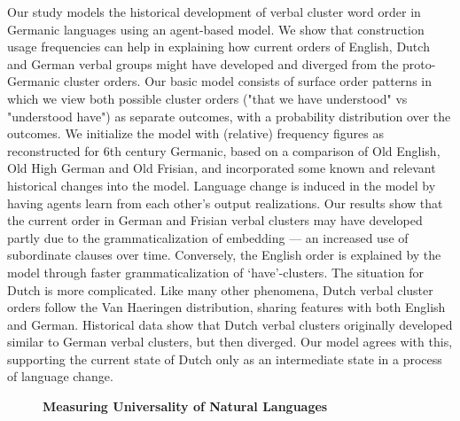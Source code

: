\documentclass[10pt, a4paper, twopage, headinclude, footinclude, BCOR5mm]{scrartcl}
\begin{document}
\noindent
Our study models the historical development of verbal cluster word order in Germanic languages using an agent-based model. We show that construction usage frequencies can help in explaining how current orders of English, Dutch and German verbal groups might have developed and diverged from the proto-Germanic cluster orders. Our basic model consists of surface order patterns in which we view both possible cluster orders ("that we have understood" vs "understood have") as separate outcomes, with a probability distribution over the outcomes. We initialize the model with (relative) frequency figures as reconstructed for 6th century Germanic, based on a comparison of Old English, Old High German and Old Frisian, and incorporated some known and relevant historical changes into the model. Language change is induced in the model by having agents learn from each other's output realizations.  Our results show that the current order in German and Frisian verbal clusters may have developed partly due to the grammaticalization of embedding --- an increased use of subordinate clauses over time. Conversely, the English order is explained by the model through faster grammaticalization of `have'-clusters. The situation for Dutch is more complicated. Like many other phenomena, Dutch verbal cluster orders follow the Van Haeringen distribution, sharing features with both English and German. Historical data show that Dutch verbal clusters originally developed similar to German verbal clusters, but then diverged. Our model agrees with this, supporting the current state of Dutch only as an intermediate state in a process of language change.


\newpage

\begin{figure}[t!]
\centering
\large\textbf{Measuring Universality of Natural Languages}
\vspace*{0.5cm}
\end{figure}


        \begin{table}[t!]
    \end{table}
\end{document}
